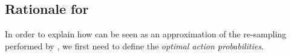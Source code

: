 
\subsection{Rationale for \TCC}

In order to explain how \TCC can be seen as an approximation of the re-sampling performed by \TTTS, we first need to define the \emph{optimal action probabilities}. 

